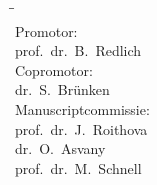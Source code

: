 \begin{titlepage}
\begin{center}
    \end{center}
    \clearpage
    \thispagestyle{empty}

    \begin{tabbing}
        \hspace{\tabcolsep}\=\hspace{0.33\textwidth}\=\hspace{0.66\textwidth}\\[-3\medskipamount]

        \> Promotor:\\[\smallskipamount]
        \> prof.\ dr.\ B.\ Redlich\\[\bigskipamount]

        \> Copromotor:\\[\smallskipamount]
        \> dr.\ S.\ Brünken\\[\bigskipamount]
        
        \> Manuscriptcommissie:\\[\smallskipamount]
        \> prof.\ dr.\ J.\ Roithova\\
        \> dr.\ O.\ Asvany\\
        \> prof.\ dr.\ M.\ Schnell\\[\medskipamount]
    \end{tabbing}
\end{titlepage}

